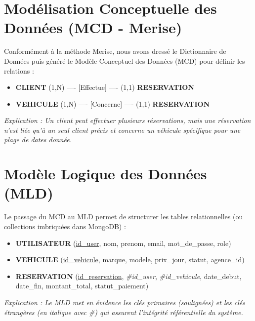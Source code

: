 \documentclass[12pt, a4paper]{report}
\begin{document}
\section{Modélisation Conceptuelle des Données (MCD - Merise)}
Conformément à la méthode Merise, nous avons dressé le Dictionnaire de Données puis généré le Modèle Conceptuel des Données (MCD) pour définir les relations :

\begin{itemize}
    \item \textbf{CLIENT} (1,N) ---- [Effectue] ---- (1,1) \textbf{RESERVATION}
    \item \textbf{VEHICULE} (1,N) ---- [Concerne] ---- (1,1) \textbf{RESERVATION}
\end{itemize}
\textit{Explication : Un client peut effectuer plusieurs réservations, mais une réservation n'est liée qu'à un seul client précis et concerne un véhicule spécifique pour une plage de dates donnée.}

\section{Modèle Logique des Données (MLD)}
Le passage du MCD au MLD permet de structurer les tables relationnelles (ou collections imbriquées dans MongoDB) :
\begin{itemize}
    \item \textbf{UTILISATEUR} (\underline{id\_user}, nom, prenom, email, mot\_de\_passe, role)
    \item \textbf{VEHICULE} (\underline{id\_vehicule}, marque, modele, prix\_jour, statut, agence\_id)
    \item \textbf{RESERVATION} (\underline{id\_reservation}, \textit{\#id\_user}, \textit{\#id\_vehicule}, date\_debut, date\_fin, montant\_total, statut\_paiement)
\end{itemize}
\textit{Explication : Le MLD met en évidence les clés primaires (soulignées) et les clés étrangères (en italique avec \#) qui assurent l'intégrité référentielle du système.}
\end{document}
